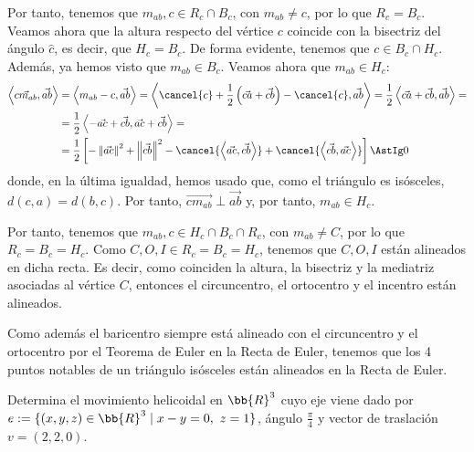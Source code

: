 \documentclass[12pt]{article}
\begin{document}
\begin{ejercicio}[2 puntos]
        Por tanto, tenemos que $m_{ab},c \in R_c \cap B_c$, con $m_{ab}\neq c$, por lo que $R_c = B_c$. Veamos ahora que la altura respecto del vértice $c$ coincide con la bisectriz del ángulo $\widehat{c}$,
        es decir, que $H_c = B_c$. De forma evidente, tenemos que $c\in B_c\cap H_c$. Además, ya hemos visto que $m_{ab}\in B_c$. Veamos ahora que $m_{ab}\in H_c$:
        \begin{align*}
            \left\langle \vec{cm_{ab}}, \vec{ab}\right\rangle &=
            \left\langle m_{ab}-c, \vec{ab}\right\rangle = \left\langle \cancel{c}+\frac{1}{2}\left(\vec{ca} + \vec{cb}\right) - \cancel{c}, \vec{ab}\right\rangle
            = \frac{1}{2}\left\langle \vec{ca} + \vec{cb}, \vec{ab}\right\rangle =\\
            &= \frac{1}{2}\left\langle -\vec{ac} + \vec{cb}, \vec{ac} + \vec{cb}\right\rangle =\\
            &= \frac{1}{2}\left[-\left\|\vec{ac}\right\|^2 + \left\|\vec{cb}\right\|^2 - \cancel{\left\langle \vec{ac}, \vec{cb}\right\rangle} + \cancel{\left\langle \vec{cb}, \vec{ac}\right\rangle}\right]
            \AstIg 0
        \end{align*}
        donde, en la última igualdad, hemos usado que, como el triángulo es isósceles, $d(c,a)=d(b,c)$. Por tanto, $\vec{cm_{ab}}\perp \vec{ab}$ y, por tanto, $m_{ab}\in H_c$.
    
        Por tanto, tenemos que $m_{ab},c \in H_c \cap B_c \cap R_c$, con $m_{ab}\neq C$, por lo que $R_c = B_c = H_c$. Como $C,O,I\in R_c=B_c=H_c$, tenemos que $C,O,I$ están alineados en dicha recta.
        Es decir, como coinciden la altura, la bisectriz y la mediatriz asociadas al vértice $C$, entonces el circuncentro, el ortocentro y el incentro están alineados.
    
        Como además el baricentro siempre está alineado con el circuncentro y el ortocentro por el Teorema de Euler en la Recta de Euler, tenemos que los 4 puntos notables de un triángulo isósceles están alineados en la Recta de Euler.
    \end{ejercicio}

    \begin{ejercicio}[4 puntos]
        Determina el movimiento helicoidal en $\bb{R}^3$ cuyo eje viene dado por $e:=\{(x,y,z)\in \bb{R}^3\mid x-y=0,~z=1\}$, ángulo $\frac{\pi}{4}$ y vector de traslación $v=(2,2,0)$.
    \end{ejercicio}
\end{document}
